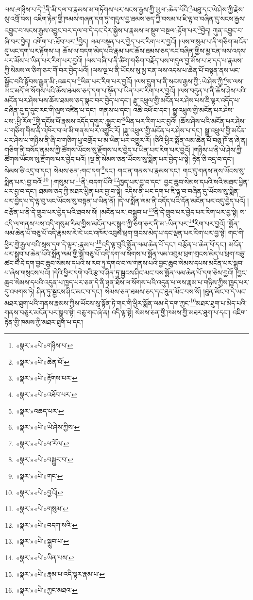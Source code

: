 ལས་:གཉིས་པ་དེ་\footnote{«སྣར་»«པེ་»གཉིས་པ་}ནི་མི་དལ་བ་རྣམས་མ་གཏོགས་པར་སངས་རྒྱས་ཀྱི་ཡུལ་:ཆེན་པོའི་\footnote{«སྣར་»«པེ་»ཆེན་པོ་}མཐུ་དང་ཡེ་ཤེས་ཀྱི་རྗེས་སུ་འགྲོ་བས། འཇིག་རྟེན་གྱི་ཁམས་གཞན་དག་ཏུ་གདུལ་བྱ་ཐམས་ཅད་ཀྱི་བསམ་པ་ཇི་ལྟ་བ་བཞིན་དུ་སངས་རྒྱས་འབྱུང་བ་སངས་རྒྱས་འབྱུང་བར་དལ་བ་དེ་དང་དེར་སྐྱེས་པ་རྣམས་ལ་སྡུག་བསྔལ་:རྟོག་པར་\footnote{«སྣར་»«པེ་»རྟོགས་པར་}བྱེད། ཀུན་འབྱུང་བ་ཞི་བར་བྱེད། འགོག་པ་:ཐོབ་པར་\footnote{«སྣར་»«པེ་»འཐོབ་པར་}བྱེད། ལམ་བསྟན་པར་བྱེད་པར་རིག་པར་བྱའོ། །ལས་གསུམ་པ་ནི་གཅིག་མངོན་དུ་ཡང་དག་པར་རྟོགས་པ། ཆོས་ལ་བདག་མེད་པའི་རྣམ་པར་ཆོས་ཐམས་ཅད་རང་བཞིན་གྱིས་མྱ་ངན་ལས་འདས་པར་མོས་པ་ཡིན་པར་རིག་པར་བྱའོ། །ལས་བཞི་པ་ནི་ཚིག་གཅིག་བརྗོད་པས་གདུལ་བྱ་མོས་པ་ཐ་དད་པ་རྣམས་ཀྱི་སེམས་ལ་ཅིག་ཅར་གོ་བར་བྱེད་པའོ། །ལས་ལྔ་པ་ནི་ཡོངས་སུ་མྱ་ངན་ལས་འདས་པ་ཆེན་པོ་བསྟན་ནས་ཡང་སྦྱོང་བའི་སྟོབས་རྒྱུན་མི་:འཆད་པ་\footnote{«སྣར་»འཆད་པར་}ཡིན་པར་རིག་པར་བྱའོ། །ལས་དྲུག་པ་ནི་སངས་རྒྱས་ཀྱི་:ཡེ་ཤེས་ཀྱི་\footnote{«སྣར་»«པེ་»ཡེ་ཤེས་ཀྱིས་}ས་ལས་ཡང་མདོ་ལ་སོགས་པའི་ཆོས་ཐམས་ཅད་དག་པ་སྟོན་པ་ཡིན་པར་རིག་པར་བྱའོ། །ལས་བདུན་པ་ནི་ཆོས་ཤེས་པའི་མངོན་པར་ཤེས་པས་ཆོས་ཐམས་ཅད་སྣང་བར་བྱེད་པ་དང་། རྫུ་འཕྲུལ་གྱི་མངོན་པར་ཤེས་པས་ཇི་ལྟར་འདོད་པ་བཞིན་དུ་ད་དུང་རང་གི་ལུས་འཛིན་པ་དང་། གནས་པ་དང་། འཆི་འཕོ་བ་དང་། སྒྱུ་འཕྲུལ་གྱི་མངོན་པར་ཤེས་པས་:ཕྱི་རོལ་\footnote{«སྣར་»«པེ་»ཕ་རོལ་}གྱི་དངོས་པོ་རྣམས་འདོད་དགུར་:སྒྱུར་བ་\footnote{«སྣར་»«པེ་»བསྒྱུར་བ་}ཡིན་པར་རིག་པར་བྱའོ། །ཆོས་ཤེས་པའི་མངོན་པར་ཤེས་པ་གཅིག་གིས་ནི་འཁོར་བ་ལ་མི་གནས་པར་འགྱུར་རོ། །རྫུ་འཕྲུལ་གྱི་མངོན་པར་ཤེས་པ་དང་། སྒྱུ་འཕྲུལ་གྱི་མངོན་པར་ཤེས་པ་གཉིས་ནི་ཞི་བ་གཅིག་པུ་བགྲོད་པ་མ་ཡིན་པར་འགྱུར་རོ། །ཅིའི་ཕྱིར་སྨོན་ལམ་ཆེན་པོ་བཅུ་ཁོ་ན་ཞེ་ན། གཅིག་ནི་བསོད་ནམས་ཀྱི་ཚོགས་ཡོངས་སུ་རྫོགས་པར་བྱེད་པ་ཡིན་པར་རིག་པར་བྱའོ། །གཉིས་པ་ནི་ཡེ་ཤེས་ཀྱི་ཚོགས་ཡོངས་སུ་རྫོགས་པར་བྱེད་པའོ། །ལྔ་ནི་སེམས་ཅན་ཡོངས་སུ་སྨིན་པར་བྱེད་པ་སྟེ། རྟེན་ཅི་འདྲ་བ་དང་། སེམས་ཅི་འདྲ་བ་དང་། སེམས་ཅན་:གང་དག་\footnote{«སྣར་»«པེ་»གང་}དང་། གང་ན་གནས་པ་རྣམས་དང་། གང་དུ་གནས་ནས་ཡོངས་སུ་སྨིན་པར་:བྱ་བའོ།\footnote{«སྣར་»«པེ་»བྱའོ།} །:གསུམ་པ་\footnote{«སྣར་»«པེ་»གསུམ་}ནི་:བདག་པོའི་\footnote{«སྣར་»«པེ་»བདག་སའི་}ཁྱད་པར་བྱ་བ་དང་། བྱང་ཆུབ་སེམས་དཔའི་སའི་མཐར་ཕྱིན་པར་བྱ་བ་དང་། ཐམས་ཅད་ཀྱི་མཐར་ཕྱིན་པར་བྱ་བ་སྟེ། འདིས་ནི་ཡང་དག་པ་ཇི་ལྟ་བ་བཞིན་དུ་ཡོངས་སུ་སྨིན་པར་བྱེད་པ་དེ་ལྟ་བུ་ཡང་ཡོངས་སུ་བསྟན་པ་ཡིན་ནོ། །དེ་ལ་སྨོན་ལམ་ནི་འདོད་པའི་དོན་མངོན་པར་འདུ་བྱེད་པའོ། །བརྩོན་པ་ནི་དེ་གྲུབ་པར་བྱེད་པའི་ཐབས་སོ། །མངོན་པར་:བསྒྲུབ་པ་\footnote{«སྣར་»«པེ་»སྒྲུབ་པ་}ནི་དེ་གྲུབ་པར་བྱེད་པར་རིག་པར་བྱ་སྟེ། ས་འདི་ལ་གནས་པས་འདི་གསུམ་རིམ་གྱིས་མངོན་པར་སྒྲུབ་ཀྱི་ཅིག་ཅར་ནི་མ་:ཡིན་པར་\footnote{«སྣར་»«པེ་»ཡིན་པས་}རིག་པར་བྱའོ། །སྨོན་ལམ་ཆེན་པོ་བཅུ་པོ་འདི་རྣམས་རེ་རེ་ཡང་འཁོར་འབུམ་ཕྲག་གྲངས་མེད་པ་དང་ལྡན་པར་རིག་པར་བྱ་སྟེ། གང་གི་ཕྱིར་ཀྱེ་རྒྱལ་བའི་སྲས་དག་དེ་ལྟར་:རྣམ་པ་\footnote{«སྣར་»«པེ་»རྣམ་པ་འདི་ལྟར་རྣམ་པ་}འདི་ལྟ་བུའི་སྨོན་ལམ་ཆེན་པོ་དང་། བརྩོན་པ་ཆེན་པོ་དང་། མངོན་པར་སྒྲུབ་པ་ཆེན་པོའི་སྨོན་ལམ་གྱི་སྒོ་བཅུ་པོ་འདི་དག་ལ་སོགས་པ་སྨོན་ལམ་འབུམ་ཕྲག་གྲངས་མེད་པ་ཕྲག་བཅུ་ཚང་བ་དེ་དག་བྱང་ཆུབ་སེམས་དཔའི་ས་རབ་ཏུ་དགའ་བ་ལ་གནས་པའི་བྱང་ཆུབ་སེམས་དཔས་མངོན་པར་སྒྲུབ་པ་ཞེས་གསུངས་པའོ། །དེའི་ཕྱིར་དགེ་བའི་རྩ་བ་ཤིན་ཏུ་སྦྱངས་ཤིང་མང་བས་སྨོན་ལམ་ཆེན་པོ་དག་ཅེས་བྱའོ། །བྱང་ཆུབ་སེམས་དཔའི་འདུན་པ་ཁྱད་པར་ཅན་དེ་ནི་ཉན་ཐོས་ལ་སོགས་པའི་འདུན་པ་ལས་རྣམ་པ་གཉིས་ཀྱིས་ཁྱད་པར་དུ་འཕགས་ཏེ། ཤིན་ཏུ་སྦྱངས་ཤིང་མང་བ་དང་། སེམས་ཅན་ཐམས་ཅད་དང་ཐུན་མོང་བས་སོ། །ཐུན་མོང་བ་དེ་ཡང་མཐར་ཐུག་པའི་གནས་རྣམས་ཀྱིས་ཡོངས་སུ་སྟོན་ཏེ་གང་གི་ཕྱིར་སྨོན་ལམ་དེ་དག་ཀྱང་\footnote{«སྣར་»«པེ་»ཀྱང་མཐའ་}མཐར་ཐུག་པ་མེད་པའི་གནས་བཅུར་མངོན་པར་སྒྲུབ་སྟེ། བཅུ་གང་ཞེ་ན། འདི་ལྟ་སྟེ། སེམས་ཅན་གྱི་ཁམས་ཀྱི་མཐར་ཐུག་པ་དང་། འཇིག་རྟེན་གྱི་ཁམས་ཀྱི་མཐར་ཐུག་པ་དང་། 